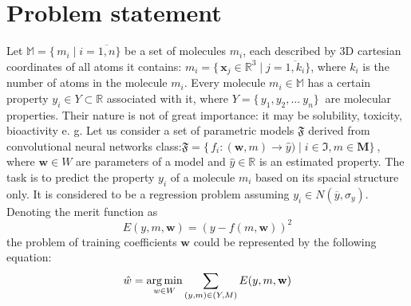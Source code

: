 \documentclass[12pt,twoside]{article}
\begin{document}
\section{Problem statement}
    Let $\mathbb{M}=\{\, m_i\mid i = \overline{1, n}\}$ be a set of molecules $m_i$, each described by 3D cartesian coordinates of all atoms it contains: $m_i=\{\,\mathbf{x}_j\in \mathbb{R}^3\mid j = \overline{1, k_i}\}$,
    where $k_i$ is the number of atoms in the molecule $m_i$.
    Every molecule $m_i \in \mathbb{M}$ has a certain property $y_i \in Y \subset \mathbb{R}$ associated with it, where $Y = \{\, y_1, y_2, ...\ y_n \}\ $ are molecular properties. 
    Their nature is not of great importance: it may be solubility, toxicity, bioactivity e. g.
\newline
    Let us consider a set of parametric models $\mathfrak{F}$ derived from convolutional neural networks class:\newline $\mathfrak{F} = \{\,f_i\colon(\mathbf{w}, m)\to \hat{y})\mid i \in \mathfrak{I}, m \in \mathbf{M} \}\ $, 
    where $\mathbf{w} \in W$  are parameters of a model and $\hat{y} \in \mathbb{R}$ is an estimated property.
    The task is to predict the property $y_i$ of a molecule $m_i$ based on its spacial structure only. It is considered to be a regression problem assuming $y_i \in N(\overline{y}, \sigma_y)$. Denoting the merit function as 
\begin{equation}
\label{merit}
    E(y, m, \mathbf{w}) = (y - f(m, \mathbf{w}))^2
\end{equation}
    the problem of training coefficients $\mathbf{w}$ could be represented by the following equation:
\begin{equation}
\label{argmin}
    \hat{w} = \underset{w \in W}{\argmin} \sum_{(y, m) \in (Y, M)} E(y, m, \mathbf{w})
\end{equation}


\end{document}
